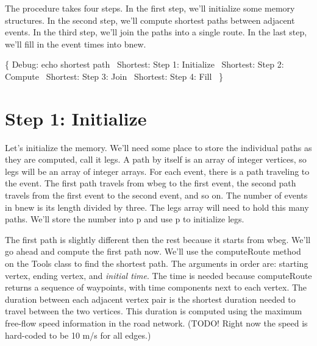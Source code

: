 The procedure takes four steps. In the first step, we'll initialize some memory
structures. In the second step, we'll compute shortest paths between adjacent
events. In the third step, we'll join the paths into a single route. In the
last step, we'll fill in the event times into {\Tt{}bnew\nwendquote}.

\nwenddocs{}\endmoddef\nwstartdeflinemarkup{}\nwenddeflinemarkup
\{
  \LA{}Debug: echo shortest path~{\nwtagstyle{}}\RA{}
  \LA{}Shortest: Step 1: Initialize~{\nwtagstyle{}}\RA{}
  \LA{}Shortest: Step 2: Compute~{\nwtagstyle{}}\RA{}
  \LA{}Shortest: Step 3: Join~{\nwtagstyle{}}\RA{}
  \LA{}Shortest: Step 4: Fill~{\nwtagstyle{}}\RA{}
\}
\nwendcode{}\nwdocspar

\section{Step 1: Initialize}

Let's initialize the memory.  We'll need some place to store the individual
paths as they are computed, call it {\Tt{}legs\nwendquote}. A path by itself is an array of
integer vertices, so {\Tt{}legs\nwendquote} will be an array of integer arrays. For each
event, there is a path traveling to the event. The first path travels from
{\Tt{}wbeg\nwendquote} to the first event, the second path travels from the first event to
the second event, and so on. The number of events in {\Tt{}bnew\nwendquote} is its length
divided by three. The {\Tt{}legs\nwendquote} array will need to hold this many paths. We'll
store the number into {\Tt{}p\nwendquote} and use {\Tt{}p\nwendquote} to initialize {\Tt{}legs\nwendquote}.

The first path is slightly different then the rest because it starts from
{\Tt{}wbeg\nwendquote}. We'll go ahead and compute the first path now. We'll use the
{\Tt{}computeRoute\nwendquote} method on the {\Tt{}Tools\nwendquote} class to find the shortest path.  The
arguments in order are: starting vertex, ending vertex, and \textit{initial
time}. The time is needed because {\Tt{}computeRoute\nwendquote} returns a sequence of
waypoints, with time components next to each vertex. The duration between each
adjacent vertex pair is the shortest duration needed to travel between the two
vertices. This duration is computed using the maximum free-flow speed
information in the road network. (TODO! Right now the speed is hard-coded to be
10 m/s for all edges.)

